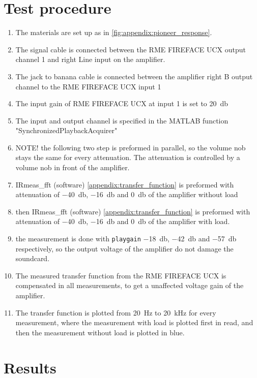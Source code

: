 \section*{Test procedure}


\begin{enumerate}
\item The materials are set up as in \autoref{fig:appendix:pioneer_response}.
\item The signal cable is connected between the RME FIREFACE UCX output channel 1 and right Line input on the amplifier.
\item The jack to banana cable is connected between the amplifier right B output channel to the  RME FIREFACE UCX input 1 
\item The input gain of RME FIREFACE UCX at input 1 is set to \SI{20}{\decibel}
\item The input and output channel is specified in the MATLAB function "SynchronizedPlaybackAcquirer" 
\item NOTE! the following two step is preformed in parallel, so the volume nob stays the same for every attenuation. The attenuation is controlled by a volume nob in front of the amplifier.
\item IRmeas_fft (software) \autoref{appendix:transfer_function} is preformed with attenuation of \SI{-40}{\decibel}, \SI{-16}{\decibel}  and  \SI{0}{\decibel} of the amplifier without load 
\item then IRmeas_fft (software) \autoref{appendix:transfer_function} is preformed with attenuation of \SI{-40}{\decibel}, \SI{-16}{\decibel} and \SI{0}{\decibel} of the amplifier with load. 
\item the measurement is done with \texttt{playgain} \SI{-18}{\decibel}, \SI{-42}{\decibel} and \SI{-57}{\decibel} respectively, so the output voltage of the amplifier do not damage the soundcard.
\item The measured transfer function from the RME FIREFACE UCX is compensated in all measurements, to get a unaffected voltage gain of the amplifier.
\item The transfer function is plotted from \SI{20}{\hertz} to \SI{20}{\kilo\hertz} for every measurement, where the measurement with load is plotted first in read, and then the measurement without load is plotted in blue.

\end{enumerate}

\section*{Results}



